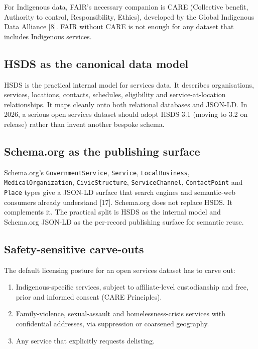 \documentclass[11pt,a4paper]{article}
\begin{document}
For Indigenous data, FAIR's necessary companion is CARE (Collective benefit, Authority to control, Responsibility, Ethics), developed by the Global Indigenous Data Alliance [8]. FAIR without CARE is not enough for any dataset that includes Indigenous services.

\subsection{HSDS as the canonical data model}

HSDS is the practical internal model for services data. It describes organisations, services, locations, contacts, schedules, eligibility and service-at-location relationships. It maps cleanly onto both relational databases and JSON-LD. In 2026, a serious open services dataset should adopt HSDS 3.1 (moving to 3.2 on release) rather than invent another bespoke schema.

\subsection{Schema.org as the publishing surface}

Schema.org's \texttt{GovernmentService}, \texttt{Service}, \texttt{LocalBusiness}, \texttt{MedicalOrganization}, \texttt{CivicStructure}, \texttt{ServiceChannel}, \texttt{ContactPoint} and \texttt{Place} types give a JSON-LD surface that search engines and semantic-web consumers already understand [17]. Schema.org does not replace HSDS. It complements it. The practical split is HSDS as the internal model and Schema.org JSON-LD as the per-record publishing surface for semantic reuse.

\subsection{Safety-sensitive carve-outs}

The default licensing posture for an open services dataset has to carve out:

\begin{enumerate}[nosep]
    \item Indigenous-specific services, subject to affiliate-level custodianship and free, prior and informed consent (CARE Principles).
    \item Family-violence, sexual-assault and homelessness-crisis services with confidential addresses, via suppression or coarsened geography.
    \item Any service that explicitly requests delisting.
\end{enumerate}
\end{document}
